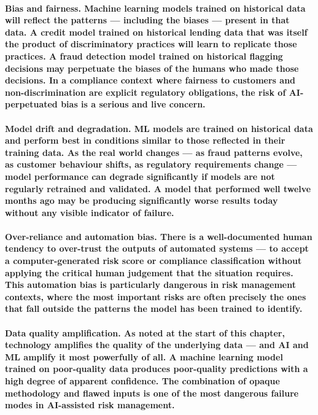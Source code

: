 \paragraph{\textbf{Bias and fairness}. Machine learning models trained on historical data will reflect the patterns — including the biases — present in that data. A credit model trained on historical lending data that was itself the product of discriminatory practices will learn to replicate those practices. A fraud detection model trained on historical flagging decisions may perpetuate the biases of the humans who made those decisions. In a compliance context where fairness to customers and non-discrimination are explicit regulatory obligations, the risk of AI-perpetuated bias is a serious and live concern.}
\paragraph{\textbf{Model drift and degradation}. ML models are trained on historical data and perform best in conditions similar to those reflected in their training data. As the real world changes — as fraud patterns evolve, as customer behaviour shifts, as regulatory requirements change — model performance can degrade significantly if models are not regularly retrained and validated. A model that performed well twelve months ago may be producing significantly worse results today without any visible indicator of failure.}
\paragraph{\textbf{Over-reliance and automation bias}. There is a well-documented human tendency to over-trust the outputs of automated systems — to accept a computer-generated risk score or compliance classification without applying the critical human judgement that the situation requires. This automation bias is particularly dangerous in risk management contexts, where the most important risks are often precisely the ones that fall outside the patterns the model has been trained to identify.}
\paragraph{\textbf{Data quality amplification}. As noted at the start of this chapter, technology amplifies the quality of the underlying data — and AI and ML amplify it most powerfully of all. A machine learning model trained on poor-quality data produces poor-quality predictions with a high degree of apparent confidence. The combination of opaque methodology and flawed inputs is one of the most dangerous failure modes in AI-assisted risk management.}

